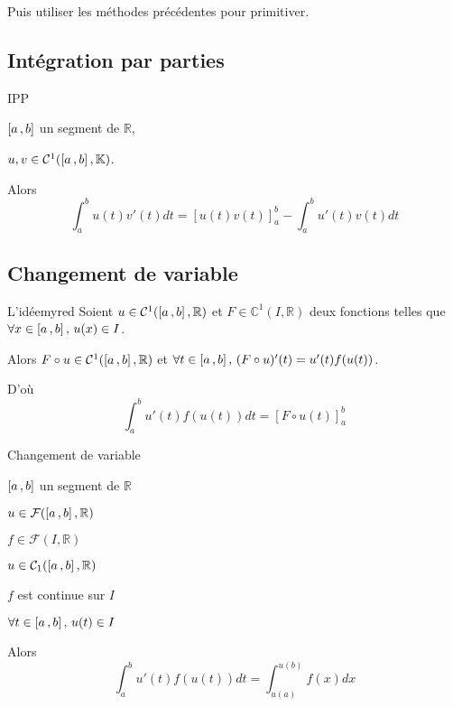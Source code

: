     Puis utiliser les méthodes précédentes pour primitiver.

\subsection{Intégration par parties}

    \begin{theo}{IPP}{}
        \begin{soit}
            \item $\left[ a \, , b \right]$ un segment de $\mathbb{R}$,
            \item $u,v \in \mathcal{C}^1(\left[ a \, , b \right],\mathbb{K})$.
        \end{soit}
        Alors 
        \[ \int_{a}^{b} u(t)v'(t)dt = [u(t)v(t)]_a^b - \int_{a}^{b} u'(t)v(t)dt \]
    \end{theo}

\subsection{Changement de variable}

    \begin{omed}{L’idée}{myred}
        Soient $u \in \mathcal{C}^1(\left[ a \, , b \right],\mathbb{R})$ et $F \in \mathbb{C}^1(I, \mathbb{R})$ deux fonctions telles que $\forall x \in \left[ a \, , b \right], \, u(x) \in I$.

        Alors $F \circ u \in \mathcal{C}^1(\left[ a \, , b \right],\mathbb{R})$ et $\forall t \in \left[ a \, , b \right], \, (F \circ u)'(t) = u'(t)f(u(t))$.

        D’où \[ \int_{a}^{b} u'(t)f(u(t))dt = [F \circ u(t)]^b_a \]
    \end{omed}

    \begin{theo}{Changement de variable}{}
        \begin{soient}
            \item $\left[ a \, , b \right]$ un segment de $\mathbb{R}$
            \item $u \in \mathcal{F}(\left[ a \, , b \right],\mathbb{R})$
            \item $f \in \mathcal{F}(I,\mathbb{R})$
        \end{soient}
        \begin{suppose}
            \item $u \in \mathcal{C}_1(\left[ a \, , b \right],\mathbb{R})$
            \item $f$ est continue sur $I$
            \item $\forall t \in \left[ a \, , b \right], \, u(t) \in I$
        \end{suppose}
        Alors \[ \int_{a}^{b} u'(t)f(u(t))dt = \int_{u(a)}^{u(b)} f(x)dx \]
    \end{theo}

